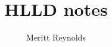 \documentclass[11pt]{article}
\title{HLLD notes}
\author{Meritt Reynolds}
\begin{document}
\maketitle

\newcommand\vect[1]{\mathbf{#1}}

\newcommand\sgn{\operatorname{sgn}}

\newcommand\stateL{\mathrm{L}}
\newcommand\stateR{\mathrm{R}}

\newcommand\sByL{{B_{y_\stateL}^{*}}}
\newcommand\sByR{{B_{y_\stateR}^{*}}}

\newcommand\sBzL{{B_{y_\stateL}^{*}}}
\newcommand\sBzR{{B_{y_\stateR}^{*}}}

\newcommand\rhoL{{\rho_\stateL}}
\newcommand\rhoR{{\rho_\stateR}}
\newcommand\srhoL{{\rho^{*}_\stateL}}
\newcommand\srhoR{{\rho^{*}_\stateR}}
\newcommand\srhoa{{\rho^{*}_\alpha}}
\newcommand\ssrhoa{{\rho^{**}_\alpha}}

\newcommand\pTL{{p_{T_\stateL}}}
\newcommand\pTR{{p_{T_\stateR}}}

\newcommand\spTL{{p^{*}_{T_\stateL}}}
\newcommand\spTR{{p^{*}_{T_\stateR}}}
\newcommand\spTa{{p^{*}_{T_\alpha}}}
\newcommand\spT{{p^{*}_{T}}}

\newcommand\sspTL{{p^{**}_{T_\stateL}}}
\newcommand\sspTR{{p^{**}_{T_\stateR}}}
\newcommand\sspTa{{p^{**}_{T_\alpha}}}

\newcommand\uL{{u_\stateL}}
\newcommand\uR{{u_\stateR}}

\newcommand\vL{{v_\stateL}}
\newcommand\vR{{v_\stateR}}

\newcommand\wL{{w_\stateL}}
\newcommand\wR{{w_\stateR}}

\newcommand\svL{{v^{*}_\stateL}}
\newcommand\svR{{v^{*}_\stateR}}

\newcommand\swL{{w^{*}_\stateL}}
\newcommand\swR{{w^{*}_\stateR}}

\newcommand\ssvL{{v^{**}_\stateL}}
\newcommand\ssvR{{v^{**}_\stateR}}
\newcommand\ssv{{v^{**}}}

\newcommand\sswL{{w^{**}_\stateL}}
\newcommand\sswR{{w^{**}_\stateR}}
\newcommand\ssw{{w^{**}}}

\newcommand\ssByL{{B_{yL}^{**}}}
\newcommand\ssByR{{B_{yR}^{**}}}
\newcommand\ssBy{{B_y^{**}}}
\end{document}
